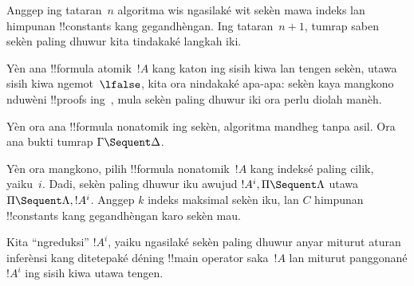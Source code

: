 \documentclass[../../../include/open-logic-section]{subfiles}
\begin{document}
Anggep ing tataran~$n$ algoritma wis ngasilaké wit
sekèn mawa indeks lan himpunan !!{constant}s kang
gegandhèngan. Ing tataran~$n+1$, tumrap saben
sekèn paling dhuwur kita tindakaké langkah iki.

Yèn ana !!{formula} atomik~$!A$ kang katon ing sisih kiwa
lan tengen sekèn, utawa sisih kiwa ngemot~$\lfalse$,
kita ora nindakaké apa-apa: sekèn kaya mangkono
nduwèni !!{proof}s ing~, mula sekèn paling
dhuwur iki ora perlu diolah manèh.

Yèn ora ana !!{formula} nonatomik ing sekèn,
algoritma mandheg tanpa asil. Ora ana bukti tumrap
$\Gamma \Sequent \Delta$.

Yèn ora mangkono, pilih !!{formula} nonatomik~$!A$
kang indeksé paling cilik, yaiku~$i$. Dadi, sekèn
paling dhuwur iku awujud $!A^i, \Pi \Sequent \Lambda$
utawa $\Pi \Sequent \Lambda, !A^i$. Anggep $k$
indeks maksimal sekèn iku, lan $C$ himpunan
!!{constant}s kang gegandhèngan karo sekèn mau.

Kita ``ngreduksi'' $!A^i$, yaiku ngasilaké sekèn
paling dhuwur anyar miturut aturan inferènsi kang
ditetepaké déning !!{main operator} saka~$!A$ lan
miturut panggonané $!A^i$ ing sisih kiwa utawa tengen.
\end{document}
